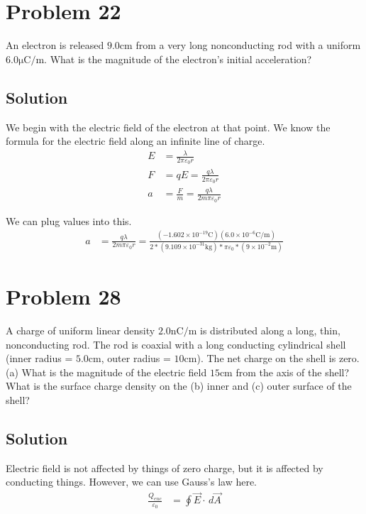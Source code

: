 \documentclass[12pt]{article}
\begin{document}
\pagebreak
\section{Problem 22}
An electron is released $9.0 \unit{\centi\meter}$ from a very long nonconducting rod with a uniform $6.0 \unit{\micro\coulomb/\meter}$. What is the magnitude of the electron's initial acceleration?

\subsection*{Solution}
We begin with the electric field of the electron at that point. We know the formula for the electric field along an infinite line of charge.
\begin{align*}
    E   &=  \frac{\lambda}{2\pi\varepsilon_0 r}\\
    F   &=  qE
        =   \frac{q\lambda}{2\pi\varepsilon_0 r}\\
    a   &=  \frac{F}{m}
        =   \frac{q\lambda}{2m\pi\varepsilon_0 r}
\end{align*}

We can plug values into this.
\begin{align*}
    a   &=  \frac{q\lambda}{2m\pi\varepsilon_0 r}
        =   \frac{(-1.602 \times 10^{-19} \unit{\coulomb})(6.0 \times 10^{-6}\unit{\coulomb/\meter})}{2*(9.109 \times 10^{-31} \unit{\kilo\gram}) * \pi\varepsilon_0 * (9 \times 10^{-2} \unit{\meter})}
\end{align*}

\pagebreak
\section{Problem 28}
A charge of uniform linear density $2.0 \unit{\nano\coulomb/\meter}$ is distributed along a long, thin, nonconducting rod. The rod is coaxial with a long conducting cylindrical shell (inner radius = $5.0 \unit{\centi\meter}$, outer radius = $10 \unit{\centi\meter}$). The net charge on the shell is zero. (a) What is the magnitude of the electric field $15 \unit{\centi\meter}$ from the axis of the shell? What is the surface charge density on the (b) inner and (c) outer surface of the shell?

\subsection{Solution}
Electric field is not affected by things of zero charge, but it is affected by conducting things. However, we can use Gauss's law here.
\begin{align*}
    \frac{Q_{enc}}{\varepsilon_0}   &=  \oint \vec{E} \cdot \,d\vec{A}
\end{align*}
\end{document}
